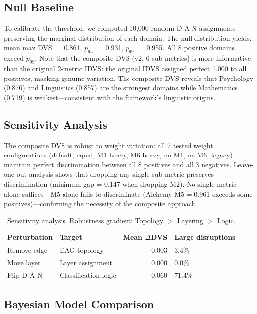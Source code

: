 \documentclass[11pt, a4paper]{article}
\begin{document}
\subsection{Null Baseline}

To calibrate the threshold, we computed 10,000 random D-A-N assignments preserving the marginal distribution of each domain. The null distribution yields: mean max DVS~=~0.861, $p_{95}$~=~0.931, $p_{99}$~=~0.955. All 8 positive domains exceed $p_{99}$. Note that the composite DVS (v2, 6 sub-metrics) is more informative than the original 2-metric IDVS: the original IDVS assigned perfect 1.000 to all positives, masking genuine variation. The composite DVS reveals that Psychology (0.876) and Linguistics (0.857) are the strongest domains while Mathematics (0.719) is weakest---consistent with the framework's linguistic origins.

\subsection{Sensitivity Analysis}
\label{sec:sensitivity}

The composite DVS is robust to weight variation: all 7 tested weight configurations (default, equal, M1-heavy, M6-heavy, no-M1, no-M6, legacy) maintain perfect discrimination between all 8 positives and all 3 negatives. Leave-one-out analysis shows that dropping any single sub-metric preserves discrimination (minimum gap = 0.147 when dropping M2). No single metric alone suffices---M5 alone fails to discriminate (Alchemy M5 = 0.961 exceeds some positives)---confirming the necessity of the composite approach.

\begin{table}[ht]
\centering
\small
\begin{tabular}{llrl}
\toprule
\textbf{Perturbation} & \textbf{Target} & \textbf{Mean $\Delta$DVS} & \textbf{Large disruptions} \\
\midrule
Remove edge  & DAG topology        & $-0.003$ & 3.4\% \\
Move layer   & Layer assignment    & $0.000$  & 0.0\% \\
Flip D-A-N   & Classification logic & $-0.060$ & 71.4\% \\
\bottomrule
\end{tabular}
\caption{Sensitivity analysis. Robustness gradient: Topology $>$ Layering $>$ Logic.}
\label{tab:sensitivity}
\end{table}

\subsection{Bayesian Model Comparison}
\end{document}
